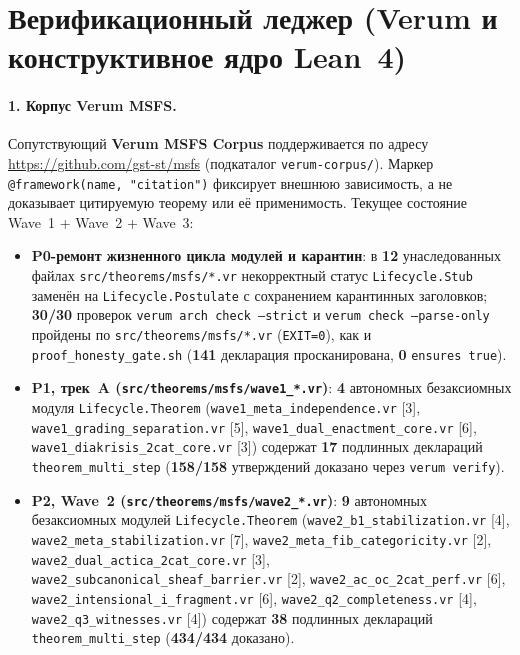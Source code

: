 \documentclass[11pt]{article}
\theoremstyle{plain}
\theoremstyle{definition}
\begin{document}
\section{Верификационный леджер (Verum и конструктивное ядро Lean~4)}\label{app:verification-ledger}

\paragraph{1. Корпус Verum MSFS.}
Сопутствующий \textbf{Verum MSFS Corpus} поддерживается по адресу \mbox{\url{https://github.com/gst-st/msfs}} (подкаталог \texttt{verum-corpus/}). Маркер \texttt{@framework(name, "citation")} фиксирует внешнюю зависимость, а не доказывает цитируемую теорему или её применимость. Текущее состояние Wave~1 + Wave~2 + Wave~3:
\begin{itemize}[nosep]
\item \textbf{P0-ремонт жизненного цикла модулей и карантин}: в \textbf{12} унаследованных файлах \texttt{src/\allowbreak theorems/\allowbreak msfs/*.vr} некорректный статус \texttt{Lifecycle.\allowbreak Stub} заменён на \texttt{Lifecycle.\allowbreak Postulate} с сохранением карантинных заголовков; \textbf{30/30} проверок \texttt{verum arch check --strict} и \texttt{verum check --parse-only} пройдены по \texttt{src/theorems/msfs/*.vr} (\texttt{EXIT=0}), как и \texttt{proof\_honesty\_gate.sh} (\textbf{141} декларация просканирована, \textbf{0} \texttt{ensures true}).
\item \textbf{P1, трек~A (\texttt{src/\allowbreak theorems/\allowbreak msfs/\allowbreak wave1\_*.vr})}: \textbf{4} автономных безаксиомных модуля \texttt{Lifecycle.\allowbreak Theorem} (\texttt{wave1\_\allowbreak meta\_\allowbreak independence.vr} [3], \texttt{wave1\_\allowbreak grading\_\allowbreak separation.vr} [5], \texttt{wave1\_\allowbreak dual\_\allowbreak enactment\_\allowbreak core.vr} [6], \texttt{wave1\_\allowbreak diakrisis\_\allowbreak 2cat\_\allowbreak core.vr} [3]) содержат \textbf{17} подлинных деклараций \texttt{theorem\_multi\_step} (\textbf{158/158} утверждений доказано через \texttt{verum verify}).
\item \textbf{P2, Wave~2 (\texttt{src/\allowbreak theorems/\allowbreak msfs/\allowbreak wave2\_*.vr})}: \textbf{9} автономных безаксиомных модулей \texttt{Lifecycle.\allowbreak Theorem} (\texttt{wave2\_\allowbreak b1\_\allowbreak stabilization.vr} [4], \texttt{wave2\_\allowbreak meta\_\allowbreak stabilization.vr} [7], \texttt{wave2\_\allowbreak meta\_\allowbreak fib\_\allowbreak categoricity.vr} [2], \texttt{wave2\_\allowbreak dual\_\allowbreak actica\_\allowbreak 2cat\_\allowbreak core.vr} [3], \texttt{wave2\_\allowbreak subcanonical\_\allowbreak sheaf\_\allowbreak barrier.vr} [2], \texttt{wave2\_\allowbreak ac\_\allowbreak oc\_\allowbreak 2cat\_\allowbreak perf.vr} [6], \texttt{wave2\_\allowbreak intensional\_\allowbreak i\_\allowbreak fragment.vr} [6], \texttt{wave2\_\allowbreak q2\_\allowbreak completeness.vr} [4], \texttt{wave2\_\allowbreak q3\_\allowbreak witnesses.vr} [4]) содержат \textbf{38} подлинных деклараций \texttt{theorem\_multi\_step} (\textbf{434/434} доказано).

\end{itemize}
\end{document}
